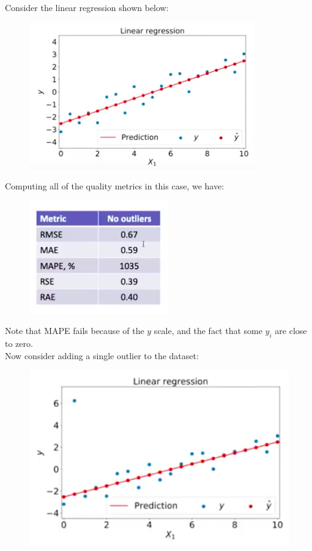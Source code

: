 \begin{frameex}
Consider the linear regression shown below:
\begin{figure}[H]
\centering
\includegraphics[scale=0.4]{qualitycomparison1.png}
\end{figure}
Computing all of the quality metrics in this case, we have:
\begin{figure}[H]
\centering
\includegraphics[scale=0.4]{qualitycomparison2.png}
\end{figure}
Note that MAPE fails because of the $y$ scale, and the fact that some $y_i$ are close to zero.\\

Now consider adding a single outlier to the dataset:
\begin{figure}[H]
\centering
\includegraphics[scale=0.4]{qualitycomparison3.png}
\end{figure}



\end{frameex}
